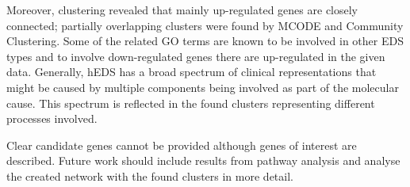 Moreover, clustering revealed that mainly up-regulated genes are closely connected; partially overlapping clusters were found by MCODE and Community Clustering. Some of the related GO terms are known to be involved in other EDS types and to involve down-regulated genes there are up-regulated in the given data. Generally, hEDS has a broad spectrum of clinical representations that might be caused by multiple components being involved as part of the molecular cause. This spectrum is reflected in the found clusters representing different processes involved.

Clear candidate genes cannot be provided although genes of interest are described. Future work should include results from pathway analysis and analyse the created network with the found clusters in more detail.


